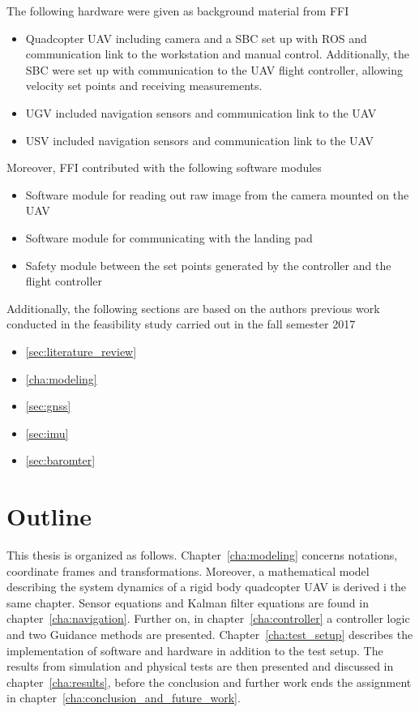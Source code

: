 The following hardware were given as background material from \gls{FFI}
\begin{itemize}
	\item Quadcopter \gls{UAV} including camera and a \gls{SBC} set up with ROS and communication link to the workstation and manual control. Additionally, the \gls{SBC} were set up with communication to the \gls{UAV} flight controller, allowing velocity set points and receiving measurements.
	\item \gls{UGV} included navigation sensors and communication link to the \gls{UAV}
	\item \gls{USV} included navigation sensors and communication link to the \gls{UAV}
\end{itemize}
Moreover, FFI contributed with the following software modules
\begin{itemize}
	\item Software module for reading out raw image from the camera mounted on the \gls{UAV}
	\item Software module for communicating with the landing pad
	\item Safety module between the set points generated by the controller and the flight controller
\end{itemize}

Additionally, the following sections are based on the authors previous work conducted in the feasibility study carried out in the fall semester 2017 \citep{Line2017}
\begin{itemize}
	\item \ref{sec:literature_review} 
	\item \ref{cha:modeling} 
	\item \ref{sec:gnss} 
	\item \ref{sec:imu} 
	\item \ref{sec:baromter} 
\end{itemize}


\section{Outline} %
\label{sec:outline}
This thesis is organized as follows. Chapter~\ref{cha:modeling} concerns notations, coordinate frames and transformations. Moreover, a mathematical model describing the system dynamics of a rigid body quadcopter \gls{UAV} is derived i the same chapter. Sensor equations and Kalman filter equations are found in chapter~\ref{cha:navigation}. Further on, in chapter~\ref{cha:controller} a controller logic and two Guidance methods are presented. Chapter~\ref{cha:test_setup} describes the implementation of software and hardware in addition to the test setup. The results from simulation and physical tests are then presented and discussed in chapter~\ref{cha:results}, before the conclusion and further work ends the assignment in chapter~\ref{cha:conclusion_and_future_work}.

